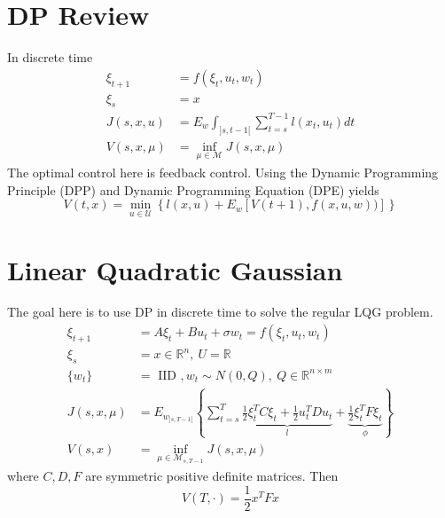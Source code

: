 \documentclass[lecture,12pt,]{pcms-l}
\begin{document}
\mainmatter
\setcounter{page}{1}

\lectureseries[\course]{\course}

\date{October 13, 2009}

\setaddress

\setcounter{lecture}{4}
\setcounter{chapter}{4}


\section{DP Review}
In discrete time
\begin{align*}
\xi_{t+1} &= f(\xi_t,u_t,w_t) \\
\xi_s &= x \\
J(s,x,u) &= E_w\int_{]s,t-1[}\sum_{t=s}^{T-1}l(x_t,u_t)dt \\
V(s,x,\mu) &= \inf_{\mu\in\mathcal{M}}J(s,x,\mu)
\end{align*}
The optimal control here is feedback control. Using the Dynamic Programming Principle (DPP) and Dynamic Programming Equation (DPE) yields
$$V(t,x) = \min_{u\in\mathcal{U}}\left\lbrace l(x,u) + E_w[V(t+1),f(x,u,w))]\right\rbrace$$

\section{Linear Quadratic Gaussian}
The goal here is to use DP in discrete time to solve the regular LQG problem.
\begin{align*}
\xi_{t+1} &= A\xi_t + Bu_t + \sigma w_t = f(\xi_t,u_t,w_t) \\
\xi_s &= x \in \mathbb{R}^n, ~U=\mathbb{R} \\
\{w_t\} &= \text{ IID }, w_t\sim N(0,Q), ~Q\in\mathbb{R}^{n\times m} \\
J(s,x,\mu) &= E_{w_{]s,T-1[}} \left\lbrace \sum_{t=s}^T \underbrace{\frac{1}{2}\xi_t^T C \xi_t+\frac{1}{2}u_t^TDu_t}_{l} + \underbrace{\frac{1}{2}\xi_t^TF\xi_t}_{\phi} \right\rbrace \\
V(s,x) &= \inf_{\mu\in\mathcal{M}_{s,T-1}}J(s,x,\mu)
\end{align*}
where $C,D,F$ are symmetric positive definite matrices. Then
$$V(T,\cdot) = \frac{1}{2}x^TFx$$
\end{document}
